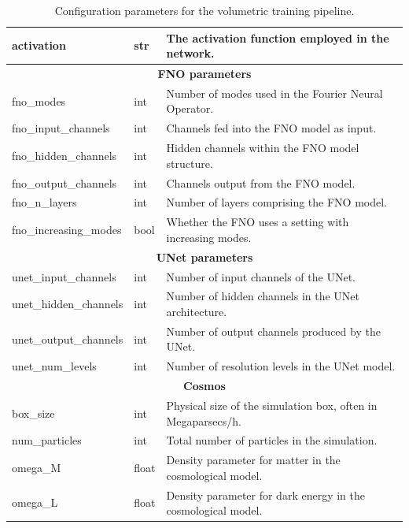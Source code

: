 \documentclass{article}
\begin{document}
\begin{table}[h!]
\begin{tabular}{||l l l||}
 activation & str & The activation function employed in the network. \\ 
 \hline
 \multicolumn{3}{||c||}{\textbf{FNO parameters}} \\
 \hline
 fno\_modes & int & Number of modes used in the Fourier Neural Operator. \\ 
 fno\_input\_channels & int & Channels fed into the FNO model as input. \\ 
 fno\_hidden\_channels & int & Hidden channels within the FNO model structure. \\ 
 fno\_output\_channels & int & Channels output from the FNO model. \\ 
 fno\_n\_layers & int & Number of layers comprising the FNO model. \\ 
 fno\_increasing\_modes & bool & Whether the FNO uses a setting with increasing modes. \\ 
 \hline
 \multicolumn{3}{||c||}{\textbf{UNet parameters}} \\
 \hline
 unet\_input\_channels & int & Number of input channels of the UNet. \\ 
 unet\_hidden\_channels & int & Number of hidden channels in the UNet architecture. \\ 
 unet\_output\_channels & int & Number of output channels produced by the UNet. \\ 
 unet\_num\_levels & int & Number of resolution levels in the UNet model. \\ 
 \hline
 \multicolumn{3}{||c||}{\textbf{Cosmos}} \\
 \hline
 box\_size & int & Physical size of the simulation box, often in Megaparsecs/h. \\ 
 num\_particles & int & Total number of particles in the simulation. \\ 
 omega\_M & float & Density parameter for matter in the cosmological model. \\ 
 omega\_L & float & Density parameter for dark energy in the cosmological model. \\ 
 \hline
\end{tabular}
\caption{Configuration parameters for the volumetric training pipeline.}
\label{table:config}
\end{table}
\end{document}
